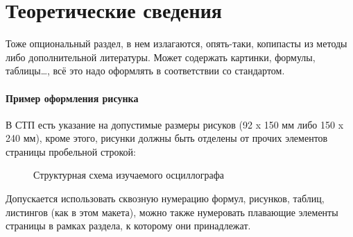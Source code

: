 \section{Теоретические сведения}

Тоже опциональный раздел, в нем излагаются, опять-таки, копипасты из методы либо
дополнительной литературы.
Может содержать картинки, формулы, таблицы\dots, всё это надо оформлять
в соответствии со стандартом.

\paragraph{Пример оформления рисунка} В СТП есть указание на допустимые размеры рисуков (92 x 150 мм либо 150 x 240 мм),
кроме этого, рисунки должны быть отделены от прочих элементов страницы пробельной строкой:
\begin{figure}[h!]
  \caption{Структурная схема изучаемого осциллографа}
\end{figure}

Допускается использовать сквозную нумерацию формул, рисунков, таблиц, листингов (как в этом макета),
можно также нумеровать плавающие элементы страницы в рамках раздела, к которому они принадлежат.

\newpage